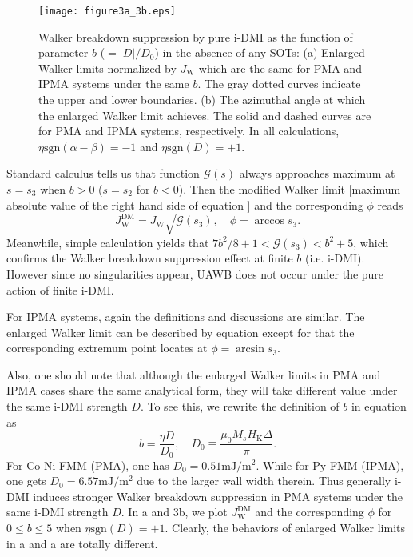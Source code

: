 \documentclass[12pt]{iopart}
\begin{document}
\begin{figure}[htbp]
	\centering
	\texttt{[image: figure3a\_3b.eps]}
	\caption{Walker breakdown suppression by pure i-DMI as the function of parameter 
		$b$ ($=|D|/D_0$) in the absence of any SOTs:
		(a) Enlarged Walker limits normalized by $J_{\mathrm{W}}$ which are the same for PMA and 
		IPMA systems under the same $b$. The gray dotted curves indicate the upper and lower boundaries.
		(b) The azimuthal angle at which the enlarged Walker limit achieves. The solid and dashed
		curves are for PMA and IPMA systems, respectively. 
		 In all calculations, $\eta\mathrm{sgn}(\alpha-\beta)=-1$ and $\eta\mathrm{sgn}(D)=+1$.}\label{fig3}
\end{figure}

Standard calculus tells us that function $\mathcal{G}(s)$ always
approaches maximum at $s=s_3$ when $b>0$ ($s=s_2$ for $b<0$).
Then the modified Walker limit [maximum absolute value of the right hand side
of equation ] and the corresponding $\phi$ reads
\begin{equation}\label{WB2_only_FL_SOTs}
J_{\mathrm{W}}^{\mathrm{DM}}=J_{\mathrm{W}}\sqrt{\mathcal{G}(s_3)}, \quad \phi=\arccos s_3.
\end{equation} 
Meanwhile, simple calculation yields that $7b^2/8+1<\mathcal{G}(s_3)<b^2+5$, which
confirms the Walker breakdown suppression effect at finite $b$ (i.e. i-DMI).
However since no singularities appear, UAWB 
does not occur under the pure action of finite i-DMI.

For IPMA systems, again the definitions and discussions are similar. 
The enlarged Walker limit can be described by equation 
except for that the corresponding extremum point locates at $\phi=\arcsin s_3$.

Also, one should note that although the enlarged Walker limits in
PMA and IPMA cases share the same analytical form, they will take
different value under the same i-DMI strength $D$.
To see this, we rewrite the definition of $b$ in equation  as
\begin{equation}\label{b_definition_rewrite}
b=\frac{\eta D}{D_0},\quad D_0\equiv \frac{\mu_{0}M_s H_{\mathrm{K}}\Delta}{\pi}.
\end{equation}
For Co-Ni FMM (PMA), one has $D_0=0.51 \mathrm{mJ/m^2}$. 
While for Py FMM (IPMA), one gets $D_0=6.57 \mathrm{mJ/m^2}$ due to the larger wall width therein.
Thus generally i-DMI induces stronger Walker breakdown suppression in PMA systems
under the same i-DMI strength $D$.
In a and 3b, we plot $J_{\mathrm{W}}^{\mathrm{DM}}$ and the corresponding
$\phi$ for $0\le b\le 5$ when $\eta\mathrm{sgn}(D)=+1$.
Clearly, the behaviors of enlarged Walker limits in a and a are totally different.
\end{document}
